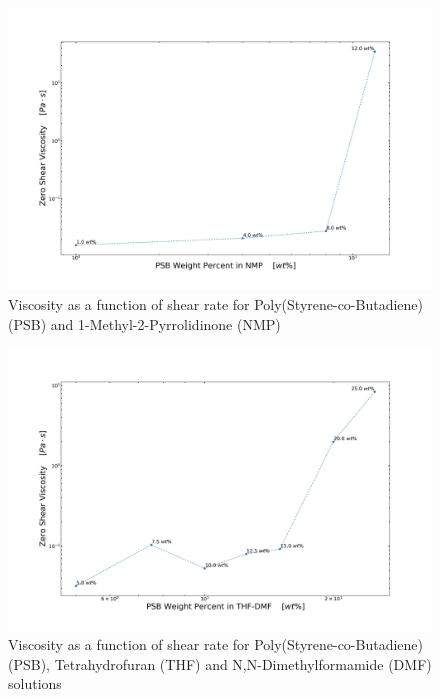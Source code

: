\begin{figure}[!th]
\centering
\includegraphics[width=\textwidth]{./Figures/c_vs_v_PSBinNMP.png}
\decoRule
\caption[Viscosity as a function of shear rate for Poly(Styrene-co-Butadiene) (PSB) and 1-Methyl-2-Pyrrolidinone (NMP) solutions]{Viscosity as a function of shear rate for Poly(Styrene-co-Butadiene) (PSB) and 1-Methyl-2-Pyrrolidinone (NMP)}
\label{fig:c_vs_v_PSBinNMP}
\end{figure}

\begin{figure}[!th]
\centering
\includegraphics[width=\textwidth]{./Figures/c_vs_v_PSBinTHF-DMF.png}
\decoRule
\caption[Viscosity as a function of shear rate for Poly(Styrene-co-Butadiene) (PSB), Tetrahydrofuran (THF) and N,N-Dimethylformamide (DMF) solutions]{Viscosity as a function of shear rate for Poly(Styrene-co-Butadiene) (PSB), Tetrahydrofuran (THF) and N,N-Dimethylformamide (DMF) solutions}
\label{fig:c_vs_v_PSBinTHF-DMF}
\end{figure}

